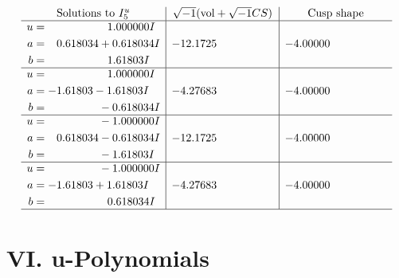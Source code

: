 \documentclass[1p]{elsarticle_modified}
\theoremstyle{definition}
\newcommand{\I}{\sqrt{-1}}
\begin{document}
$$\begin{array}{c|c|c}  
\text{Solutions to }I^u_{5}& \I (\text{vol} + \sqrt{-1}CS) & \text{Cusp shape}\\
 \hline 
\begin{aligned}
u &= \phantom{-0.000000 -}1.000000 I \\
a &= \phantom{-}0.618034 + 0.618034 I \\
b &= \phantom{-0.000000 -}1.61803 I\end{aligned}
 & -12.1725\phantom{ +0.000000I} & -4.00000\phantom{ +0.000000I} \\ \hline\begin{aligned}
u &= \phantom{-0.000000 -}1.000000 I \\
a &= -1.61803 - 1.61803 I \\
b &= \phantom{-0.000000 } -0.618034 I\end{aligned}
 & -4.27683\phantom{ +0.000000I} & -4.00000\phantom{ +0.000000I} \\ \hline\begin{aligned}
u &= \phantom{-0.000000 } -1.000000 I \\
a &= \phantom{-}0.618034 - 0.618034 I \\
b &= \phantom{-0.000000 } -1.61803 I\end{aligned}
 & -12.1725\phantom{ +0.000000I} & -4.00000\phantom{ +0.000000I} \\ \hline\begin{aligned}
u &= \phantom{-0.000000 } -1.000000 I \\
a &= -1.61803 + 1.61803 I \\
b &= \phantom{-0.000000 -}0.618034 I\end{aligned}
 & -4.27683\phantom{ +0.000000I} & -4.00000\phantom{ +0.000000I}\\
 \hline 
 \end{array}$$\newpage
\newpage\renewcommand{\arraystretch}{1}
\centering \section*{ VI. u-Polynomials}
\end{document}
